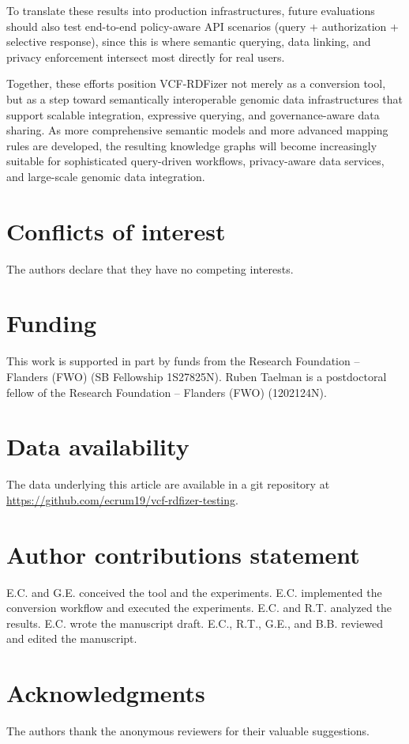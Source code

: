 \documentclass[unnumsec,webpdf,contemporary,large]{oup-authoring-template}
\begin{document}
To translate these results into production infrastructures, future evaluations should also test end-to-end policy-aware API scenarios (query + authorization + selective response), since this is where semantic querying, data linking, and privacy enforcement intersect most directly for real users.

Together, these efforts position VCF-RDFizer not merely as a conversion tool, but as a step toward semantically interoperable genomic data infrastructures that support scalable integration, expressive querying, and governance-aware data sharing.
As more comprehensive semantic models and more advanced mapping rules are developed, the resulting knowledge graphs will become increasingly suitable for sophisticated query-driven workflows, privacy-aware data services, and large-scale genomic data integration.

\section{Conflicts of interest}
The authors declare that they have no competing interests.

\section{Funding}
This work is supported in part by funds from the Research Foundation – Flanders (FWO) (SB Fellowship 1S27825N).
Ruben Taelman is a postdoctoral fellow of the Research Foundation – Flanders (FWO) (1202124N).

\section{Data availability}
The data underlying this article are available in a git repository at \url{https://github.com/ecrum19/vcf-rdfizer-testing}.

\section{Author contributions statement}
E.C. and G.E. conceived the tool and the experiments.
E.C. implemented the conversion workflow and executed the experiments.
E.C. and R.T. analyzed the results.
E.C. wrote the manuscript draft.
E.C., R.T., G.E., and B.B. reviewed and edited the manuscript.

\section{Acknowledgments}
The authors thank the anonymous reviewers for their valuable suggestions.





%
%
\end{document}
